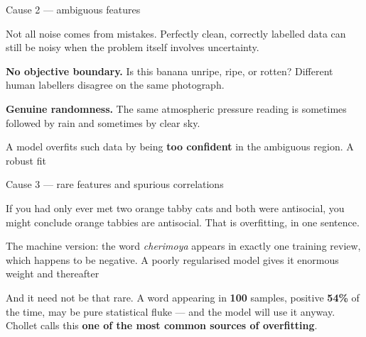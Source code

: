 \documentclass[aspectratio=169,11pt,t]{beamer}
\begin{document}
\begin{frame}[shrink=25]{Cause 2 --- ambiguous features}
{\fontsize{9.4}{12.6}\selectfont\color{fg2}Not all noise comes from mistakes. Perfectly clean, correctly labelled data can still be noisy when the problem itself involves uncertainty.\par}\vskip 4pt
\begin{minipage}[t]{0.485\textwidth}
{\fontsize{9.4}{12.6}\selectfont\color{fg2}\textbf{No objective boundary.} Is this banana unripe, ripe, or rotten? Different human labellers disagree on the same photograph.\par}\vskip 4pt

\end{minipage}%
\hfill
\begin{minipage}[t]{0.485\textwidth}
{\fontsize{9.4}{12.6}\selectfont\color{fg2}\textbf{Genuine randomness.} The same atmospheric pressure reading is sometimes followed by rain and sometimes by clear sky.\par}\vskip 4pt

\end{minipage}%
\begin{iband}[signal]
A model overfits such data by being \textbf{too confident} in the ambiguous region. A robust fit 
\end{iband}
\end{frame}

\begin{frame}[shrink=25]{Cause 3 --- rare features and spurious correlations}
{\fontsize{9.4}{12.6}\selectfont\color{fg2}If you had only ever met two orange tabby cats and both were antisocial, you might conclude orange tabbies are antisocial. That is overfitting, in one sentence.\par}\vskip 4pt
{\fontsize{9.4}{12.6}\selectfont\color{fg2}The machine version: the word \textit{cherimoya} appears in exactly one training review, which happens to be negative. A poorly regularised model gives it enormous weight and thereafter \par}\vskip 4pt
\begin{iband}[rose]
And it need not be that rare. A word appearing in \textbf{100} samples, positive \textbf{54\%} of the time, may be pure statistical fluke --- and the model will use it anyway. Chollet calls this \textbf{one of the most common sources of overfitting}.
\end{iband}
\end{frame}
\end{document}
